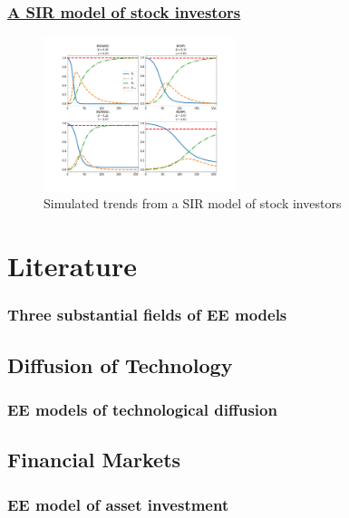 \documentclass[pdflatex]{beamer}
\begin{document}
\begin{frame}
		\frametitle{\href{https://mybinder.org/v2/gh/llorracc/EpiExp/HEAD?filepath=SIR_Ndlib.ipynb}{A SIR model of stock investors} }
		\begin{figure}[!ht] \centering  %
			\caption{Simulated trends from a SIR model of stock investors}
			\label{fig:sir_simulate}
			\centerline{\includegraphics[width=0.5\textwidth]{./figures/sir_simulate.png}}
		\end{figure}
\end{frame}

\section{Literature}\label{survey-of-the-literature}


\begin{frame}
	\frametitle{Three substantial fields of EE models}

\end{frame}

\subsection{Diffusion of Technology}\label{subsubsec:techDiffusion}

\begin{frame}
	\frametitle{EE models of technological diffusion}

\end{frame}


\subsection{Financial Markets}\label{subsec:assetprice}

\begin{frame}
	\frametitle{EE model of asset investment}

\end{frame}
\end{document}
